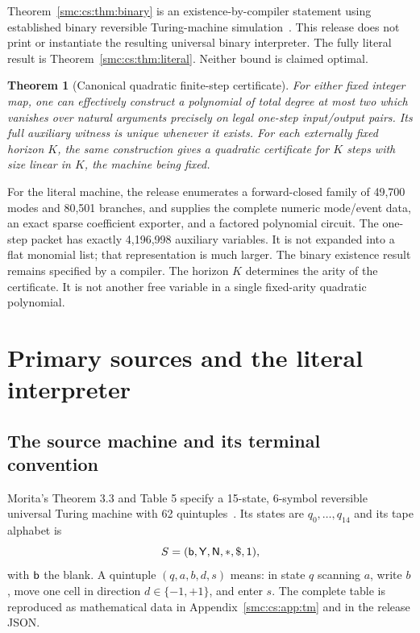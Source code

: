 \documentclass[11pt,letterpaper]{article}
\numberwithin{equation}{section}
\newtheorem{theorem}{Theorem}[section]
\theoremstyle{definition}
\theoremstyle{remark}
\newcommand{\lab}[1]{\mathsf{#1}}\newcommand{\diag}{\operatorname{diag}}
\begin{document}
Theorem~\ref{smc:cs:thm:binary} is an existence-by-compiler statement using established binary reversible Turing-machine simulation~\cite{msg1989,morita2008}. This release does not print or instantiate the resulting universal binary interpreter. The fully literal result is Theorem~\ref{smc:cs:thm:literal}. Neither bound is claimed optimal.

\begin{theorem}[Canonical quadratic finite-step certificate]\label{smc:cs:thm:quadratic-overview}
For either fixed integer map, one can effectively construct a polynomial of total degree at most two which vanishes over natural arguments precisely on legal one-step input/output pairs. Its full auxiliary witness is unique whenever it exists. For each externally fixed horizon $K$, the same construction gives a quadratic certificate for $K$ steps with size linear in $K$, the machine being fixed.
\end{theorem}

For the literal machine, the release enumerates a forward-closed family of 49,700 modes and 80,501 branches, and supplies the complete numeric mode/event data, an exact sparse coefficient exporter, and a factored polynomial circuit. The one-step packet has exactly 4,196,998 auxiliary variables. It is not expanded into a flat monomial list; that representation is much larger. The binary existence result remains specified by a compiler. The horizon $K$ determines the arity of the certificate. It is not another free variable in a single fixed-arity quadratic polynomial.

\section{Primary sources and the literal interpreter}\label{smc:cs:sec:source}
\subsection{The source machine and its terminal convention}
Morita's Theorem 3.3 and Table 5 specify a 15-state, 6-symbol reversible universal Turing machine with 62 quintuples~\cite{morita2008}. Its states are $q_0,\ldots,q_{14}$ and its tape alphabet is
\[
 S=(\blank,\lab Y,\lab N,\lab *,\lab \$,\lab 1),
\]
with $\mathsf b$ the blank. A quintuple $(q,a,b,d,s)$ means: in state $q$ scanning $a$, write $b$, move one cell in direction $d\in\{-1,+1\}$, and enter $s$. The complete table is reproduced as mathematical data in Appendix~\ref{smc:cs:app:tm} and in the release JSON.
\end{document}
